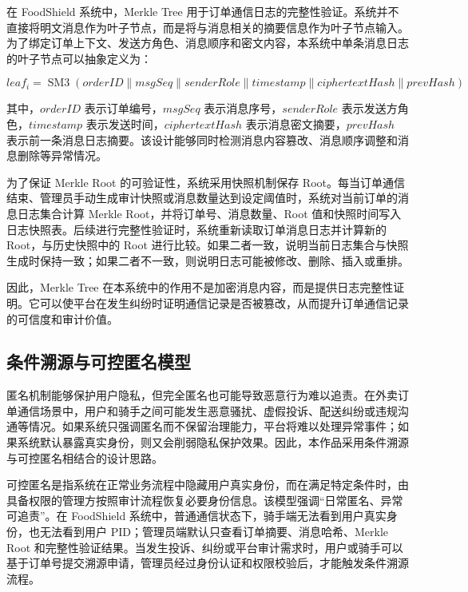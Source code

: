 \documentclass[UTF8,a4paper,zihao=-4,fontset=fandol]{ctexart}
\begin{document}
在 FoodShield 系统中，Merkle Tree 用于订单通信日志的完整性验证。系统并不直接将明文消息作为叶子节点，而是将与消息相关的摘要信息作为叶子节点输入。为了绑定订单上下文、发送方角色、消息顺序和密文内容，本系统中单条消息日志的叶子节点可以抽象定义为：

\begin{equation}
leaf_i = \operatorname{SM3}(orderID \parallel msgSeq \parallel senderRole \parallel timestamp \parallel ciphertextHash \parallel prevHash)
\end{equation}

其中，$orderID$ 表示订单编号，$msgSeq$ 表示消息序号，$senderRole$ 表示发送方角色，$timestamp$ 表示发送时间，$ciphertextHash$ 表示消息密文摘要，$prevHash$ 表示前一条消息日志摘要。该设计能够同时检测消息内容篡改、消息顺序调整和消息删除等异常情况。

为了保证 Merkle Root 的可验证性，系统采用快照机制保存 Root。每当订单通信结束、管理员手动生成审计快照或消息数量达到设定阈值时，系统对当前订单的消息日志集合计算 Merkle Root，并将订单号、消息数量、Root 值和快照时间写入日志快照表。后续进行完整性验证时，系统重新读取订单消息日志并计算新的 Root，与历史快照中的 Root 进行比较。如果二者一致，说明当前日志集合与快照生成时保持一致；如果二者不一致，则说明日志可能被修改、删除、插入或重排。

因此，Merkle Tree 在本系统中的作用不是加密消息内容，而是提供日志完整性证明。它可以使平台在发生纠纷时证明通信记录是否被篡改，从而提升订单通信记录的可信度和审计价值。

\subsection{条件溯源与可控匿名模型}

匿名机制能够保护用户隐私，但完全匿名也可能导致恶意行为难以追责。在外卖订单通信场景中，用户和骑手之间可能发生恶意骚扰、虚假投诉、配送纠纷或违规沟通等情况。如果系统只强调匿名而不保留治理能力，平台将难以处理异常事件；如果系统默认暴露真实身份，则又会削弱隐私保护效果。因此，本作品采用条件溯源与可控匿名相结合的设计思路。

可控匿名是指系统在正常业务流程中隐藏用户真实身份，而在满足特定条件时，由具备权限的管理方按照审计流程恢复必要身份信息。该模型强调“日常匿名、异常可追责”。在 FoodShield 系统中，普通通信状态下，骑手端无法看到用户真实身份，也无法看到用户 PID；管理员端默认只查看订单摘要、消息哈希、Merkle Root 和完整性验证结果。当发生投诉、纠纷或平台审计需求时，用户或骑手可以基于订单号提交溯源申请，管理员经过身份认证和权限校验后，才能触发条件溯源流程。
\end{document}
